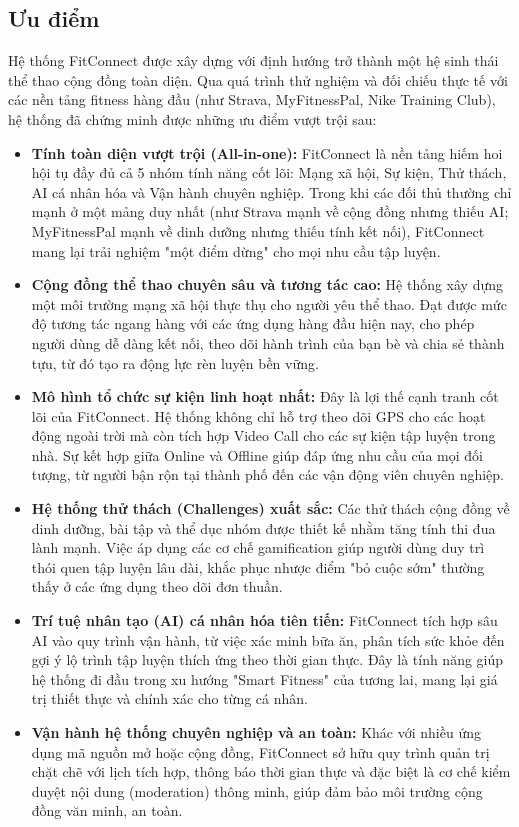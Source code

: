 \subsection{Ưu điểm}
Hệ thống FitConnect được xây dựng với định hướng trở thành một hệ sinh thái thể thao cộng đồng toàn diện. Qua quá trình thử nghiệm và đối chiếu thực tế với các nền tảng fitness hàng đầu (như Strava, MyFitnessPal, Nike Training Club), hệ thống đã chứng minh được những ưu điểm vượt trội sau:
\begin{itemize}
    \item \textbf{Tính toàn diện vượt trội (All-in-one):} FitConnect là nền tảng hiếm hoi hội tụ đầy đủ cả 5 nhóm tính năng cốt lõi: Mạng xã hội, Sự kiện, Thử thách, AI cá nhân hóa và Vận hành chuyên nghiệp. Trong khi các đối thủ thường chỉ mạnh ở một mảng duy nhất (như Strava mạnh về cộng đồng nhưng thiếu AI; MyFitnessPal mạnh về dinh dưỡng nhưng thiếu tính kết nối), FitConnect mang lại trải nghiệm "một điểm dừng" cho mọi nhu cầu tập luyện.
    \item \textbf{Cộng đồng thể thao chuyên sâu và tương tác cao:} Hệ thống xây dựng một môi trường mạng xã hội thực thụ cho người yêu thể thao. Đạt được mức độ tương tác ngang hàng với các ứng dụng hàng đầu hiện nay, cho phép người dùng dễ dàng kết nối, theo dõi hành trình của bạn bè và chia sẻ thành tựu, từ đó tạo ra động lực rèn luyện bền vững.
    \item \textbf{Mô hình tổ chức sự kiện linh hoạt nhất:} Đây là lợi thế cạnh tranh cốt lõi của FitConnect. Hệ thống không chỉ hỗ trợ theo dõi GPS cho các hoạt động ngoài trời mà còn tích hợp Video Call cho các sự kiện tập luyện trong nhà. Sự kết hợp giữa Online và Offline giúp đáp ứng nhu cầu của mọi đối tượng, từ người bận rộn tại thành phố đến các vận động viên chuyên nghiệp.
    \item \textbf{Hệ thống thử thách (Challenges) xuất sắc:} Các thử thách cộng đồng về dinh dưỡng, bài tập và thể dục nhóm được thiết kế nhằm tăng tính thi đua lành mạnh. Việc áp dụng các cơ chế gamification giúp người dùng duy trì thói quen tập luyện lâu dài, khắc phục nhược điểm "bỏ cuộc sớm" thường thấy ở các ứng dụng theo dõi đơn thuần.
    \item \textbf{Trí tuệ nhân tạo (AI) cá nhân hóa tiên tiến:} FitConnect tích hợp sâu AI vào quy trình vận hành, từ việc xác minh bữa ăn, phân tích sức khỏe đến gợi ý lộ trình tập luyện thích ứng theo thời gian thực. Đây là tính năng giúp hệ thống đi đầu trong xu hướng "Smart Fitness" của tương lai, mang lại giá trị thiết thực và chính xác cho từng cá nhân.
    \item \textbf{Vận hành hệ thống chuyên nghiệp và an toàn:} Khác với nhiều ứng dụng mã nguồn mở hoặc cộng đồng, FitConnect sở hữu quy trình quản trị chặt chẽ với lịch tích hợp, thông báo thời gian thực và đặc biệt là cơ chế kiểm duyệt nội dung (moderation) thông minh, giúp đảm bảo môi trường cộng đồng văn minh, an toàn.
\end{itemize}

